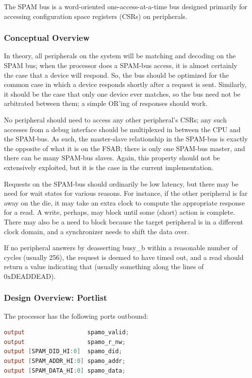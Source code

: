 \documentclass[10pt]{article}
\begin{document}
The SPAM bus is a word-oriented one-access-at-a-time bus designed primarily
for accessing configuration space registers (CSRs) on peripherals.

\subsubsection{Conceptual Overview}

In theory, all peripherals on the system will be matching and decoding on
the SPAM bus; when the processor does a SPAM-bus access, it is almost
certainly the case that a device will respond.  So, the bus should be
optimized for the common case in which a device responds shortly after a
request is sent.  Similarly, it should be the case that only one device ever
matches, so the bus need not be arbitrated between them; a simple OR'ing of
responses should work.

No peripheral should need to access any other peripheral's CSRs; any such
accesses from a debug interface should be multiplexed in between the CPU and
the SPAM-bus.  As such, the master-slave relationship in the SPAM-bus is
exactly the opposite of what it is on the FSAB; there is only one SPAM-bus
master, and there can be many SPAM-bus slaves.  Again, this property should
not be extensively exploited, but it is the case in the current
implementation.

Requests on the SPAM-bus should ordinarily be low latency, but there may be
need for wait states for various reasons.  For instance, if the other
peripheral is far away on the die, it may take an extra clock to compute the
appropriate response for a read.  A write, perhaps, may block until some
(short) action is complete.  There may also be a need to block because the
target peripheral is in a different clock domain, and a synchronizer needs
to shift the data over.

If no peripheral answers by deasserting busy\_b within a reasonable number
of cycles (usually 256), the request is deemed to have timed out, and a read
should return a value indicating that (usually something along the lines of
0xDEADDEAD).

\subsubsection{Design Overview: Portlist}

The processor has the following ports outbound:

\begin{lstlisting}[basicstyle=\footnotesize,language=Verilog]
output                  spamo_valid;
output                  spamo_r_nw;
output [SPAM_DID_HI:0]  spamo_did;
output [SPAM_ADDR_HI:0] spamo_addr;
output [SPAM_DATA_HI:0] spamo_data;
\end{lstlisting}
\end{document}
